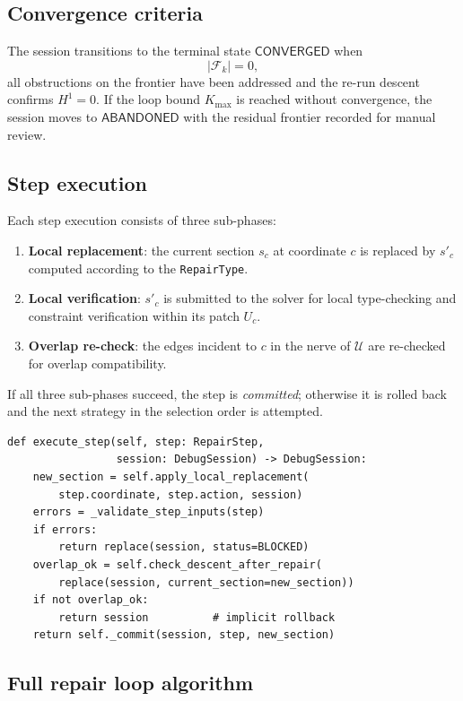 \documentclass[11pt]{article}
\newcommand{\RF}{\mathcal{F}}               %
\begin{document}
\subsection{Convergence criteria}

The session transitions to the terminal state $\mathsf{CONVERGED}$ when
\[
  |\RF_k| = 0,
\]
\ie all obstructions on the frontier have been addressed and the re-run
descent confirms $H^1 = 0$.  If the loop bound $K_{\max}$ is reached without
convergence, the session moves to $\mathsf{ABANDONED}$ with the residual
frontier recorded for manual review.

\subsection{Step execution}

Each step execution consists of three sub-phases:
\begin{enumerate}
  \item \textbf{Local replacement}: the current section $s_c$ at coordinate
        $c$ is replaced by $s'_c$ computed according to the \texttt{RepairType}.
  \item \textbf{Local verification}: $s'_c$ is submitted to the solver for
        local type-checking and constraint verification within its patch $U_c$.
  \item \textbf{Overlap re-check}: the edges incident to $c$ in the nerve of
        $\mathcal{U}$ are re-checked for overlap compatibility.
\end{enumerate}
If all three sub-phases succeed, the step is \emph{committed}; otherwise it
is rolled back and the next strategy in the selection order is attempted.

\begin{lstlisting}[style=jugeo-python,caption={Step execution with rollback (repair\_execution.py, simplified).}]
def execute_step(self, step: RepairStep,
                 session: DebugSession) -> DebugSession:
    new_section = self.apply_local_replacement(
        step.coordinate, step.action, session)
    errors = _validate_step_inputs(step)
    if errors:
        return replace(session, status=BLOCKED)
    overlap_ok = self.check_descent_after_repair(
        replace(session, current_section=new_section))
    if not overlap_ok:
        return session          # implicit rollback
    return self._commit(session, step, new_section)
\end{lstlisting}

\subsection{Full repair loop algorithm}
\label{subsec:full-algorithm}
\end{document}
